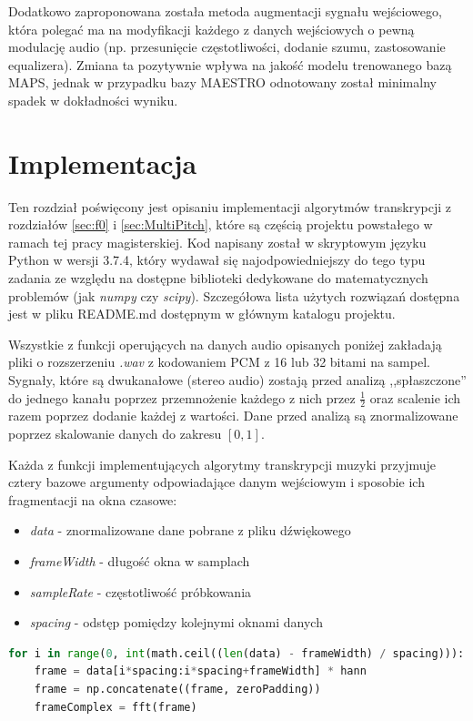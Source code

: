 \documentclass[12pt,a4paper,twoside]{mwart}
\begin{document}
Dodatkowo zaproponowana została metoda augmentacji sygnału wejściowego, która polegać ma na modyfikacji każdego z danych wejściowych o pewną modulację audio (np. przesunięcie częstotliwości, dodanie szumu, zastosowanie equalizera). Zmiana ta pozytywnie wpływa na jakość modelu trenowanego bazą MAPS, jednak w przypadku bazy MAESTRO odnotowany został minimalny spadek w dokładności wyniku. 

\newpage

\section{Implementacja}\label{sec:impl}
Ten rozdział poświęcony jest opisaniu implementacji algorytmów transkrypcji z rozdziałów \ref{sec:f0} i \ref{sec:MultiPitch}, które są częścią projektu powstałego w ramach tej pracy magisterskiej. Kod napisany został w skryptowym języku Python w wersji 3.7.4, który wydawał się najodpowiedniejszy do tego typu zadania ze względu na dostępne biblioteki dedykowane do matematycznych problemów (jak \textit{numpy} czy \textit{scipy}). Szczegółowa lista użytych rozwiązań dostępna jest w pliku README.md dostępnym w głównym katalogu projektu.

Wszystkie z funkcji operujących na danych audio opisanych poniżej zakładają pliki  o rozszerzeniu \textit{.wav} z kodowaniem PCM z 16 lub 32 bitami na sampel. Sygnały, które są dwukanałowe (stereo audio) zostają przed analizą ,,spłaszczone'' do jednego kanału poprzez przemnożenie każdego z nich przez $\frac{1}{2}$ oraz scalenie ich razem poprzez dodanie każdej z wartości. Dane przed analizą są znormalizowane poprzez skalowanie danych do zakresu $\left[0, 1\right]$.

Każda z funkcji implementujących algorytmy transkrypcji muzyki przyjmuje cztery bazowe argumenty odpowiadające danym wejściowym i sposobie ich fragmentacji na okna czasowe:
\begin{itemize}
  \item \textit{data} - znormalizowane dane pobrane z pliku dźwiękowego
  \item \textit{frameWidth} - długość okna w samplach
  \item \textit{sampleRate} - częstotliwość próbkowania
  \item \textit{spacing} - odstęp pomiędzy kolejnymi oknami danych
\end{itemize}

\begin{lstlisting}[language=Python, caption={Przykład pętli po danych wejściowych z uwzględnieniem okna czasowego}, captionpos=b, label={code:iter}]
  for i in range(0, int(math.ceil((len(data) - frameWidth) / spacing))):
    frame = data[i*spacing:i*spacing+frameWidth] * hann
    frame = np.concatenate((frame, zeroPadding))
    frameComplex = fft(frame)
\end{lstlisting}
\end{document}

